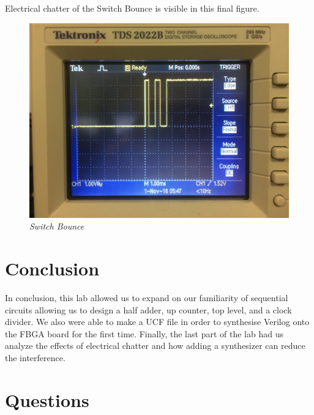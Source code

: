 \documentclass[a4paper,12pt]{article}
\begin{document}
  Electrical chatter of the Switch Bounce is visible in this final figure.
  
  \begin{figure}[h]
    \begin{center}
      \includegraphics[scale=.1]{IMG_8624.JPG}
      \caption{\textit{Switch Bounce}}
    \end{center}
  \end{figure}

\section*{Conclusion}

  \hspace{15pt}In conclusion, this lab allowed us to expand on our familiarity of sequential circuits
  allowing us to design a half adder, up counter, top level, and a clock divider. We also were able to make a UCF file in order to synthesise Verilog onto the FBGA board for the 
  first time. Finally, the last part of the lab had us analyze the effects of electrical chatter and how adding a synthesizer can reduce the interference.

\section*{Questions}
\end{document}
